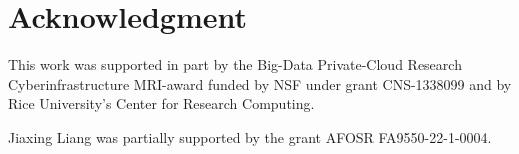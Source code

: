 \section{Acknowledgment}\label{sec:Acknowledgment}



This work was supported in part by the Big-Data Private-Cloud Research Cyberinfrastructure MRI-award funded by NSF under grant CNS-1338099 and by Rice University's Center for Research Computing.

Jiaxing Liang was partially supported by the grant AFOSR FA9550-22-1-0004. 